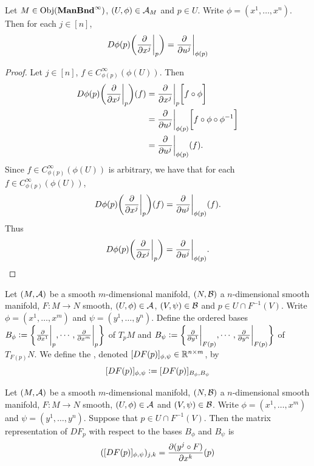 \documentclass{book}
\begin{document}
	\begin{ex}
		Let $M \in \operatorname{Obj}(\operatorname*{\text{\textbf{ManBnd}}^{\infty}})$, $(U, \phi) \in \mathcal{A}_M$ and $p \in U$. Write $\phi = (x^1, \ldots, x^n)$. Then for each $j \in [n]$, 
		$$D\phi(p) \bigg( \frac{\partial}{\partial x^j} \bigg|_p \bigg) = \frac{\partial}{\partial u^j} \bigg|_{\phi(p)}$$
	\end{ex}
	
	\begin{proof}
		Let $j \in [n]$, $f \in C^{\infty}_{\phi(p)}(\phi(U))$. Then 
		\begin{align*}
			D\phi(p) \bigg( \frac{\partial}{\partial x^j} \bigg|_p \bigg)(f) 
			& = \frac{\partial}{\partial x^j} \bigg|_p \bigg[ f \circ \phi \bigg] \\
			& = \frac{\partial}{\partial u^j} \bigg|_{\phi(p)} \bigg[ f \circ \phi \circ \phi^{-1} \bigg] \\
			& =  \frac{\partial}{\partial u^j} \bigg|_{\phi(p)} (f).
		\end{align*} 
		Since $f \in C^{\infty}_{\phi(p)}(\phi(U))$ is arbitrary, we have that for each $f \in C^{\infty}_{\phi(p)}(\phi(U))$, 
		$$D\phi(p) \bigg( \frac{\partial}{\partial x^j} \bigg|_p \bigg)(f)  = \frac{\partial}{\partial u^j} \bigg|_{\phi(p)} (f).$$ 
		Thus 
		$$D\phi(p) \bigg( \frac{\partial}{\partial x^j} \bigg|_p \bigg) = \frac{\partial}{\partial u^j} \bigg|_{\phi(p)}. $$
	\end{proof}

	\begin{defn}
		Let $(M, \mathcal{A})$ be a smooth $m$-dimensional manifold, $(N, \mathcal{B})$ a $n$-dimensional smooth manifold, $F: M \rightarrow N$ smooth, $(U, \phi) \in \mathcal{A}$, $(V, \psi) \in \mathcal{B}$ and $p \in U \cap F^{-1}(V)$. Write $\phi = (x^1, \dots, x^m)$ and $\psi = (y^1, \dots, y^n)$. Define the ordered bases $B_\phi \vcentcolon= \bigg \{\frac{\partial}{\partial x^1} \bigg|_p, \cdots, \frac{\partial}{\partial x^m} \bigg|_p \bigg \}$ of $T_pM$ and $B_{\psi} \vcentcolon= \bigg \{\frac{\partial}{\partial y^1} \bigg|_{F(p)}, \cdots, \frac{\partial}{\partial y^n} \bigg|_{F(p)} \bigg \}$ of $T_{F(p)}N$. We define the , denoted $[DF(p)]_{\phi, \psi} \in \mathbb{R}^{n \times m}$, by 
		$$[DF(p)]_{\phi, \psi} \vcentcolon= [DF(p)]_{B_{\phi}, B_{\psi}}$$
	\end{defn}

	\begin{ex}
		Let $(M, \mathcal{A})$ be a smooth $m$-dimensional manifold, $(N, \mathcal{B})$ a $n$-dimensional smooth manifold, $F: M \rightarrow N$ smooth, $(U, \phi) \in \mathcal{A}$ and $(V, \psi) \in \mathcal{B}$. Write $\phi = (x^1, \dots, x^m)$ and $\psi = (y^1, \dots, y^n)$. Suppose that $p \in U \cap F^{-1}(V)$.
		Then the matrix representation of $DF_p$ with respect to the bases
		$B_{\phi}$ and $B_{\psi}$ is 
		$$([DF(p)]_{\phi, \psi})_{j, k} =  \frac{\partial (y^j \circ F)}{\partial x^k}(p)$$
	\end{ex}
\end{document}
